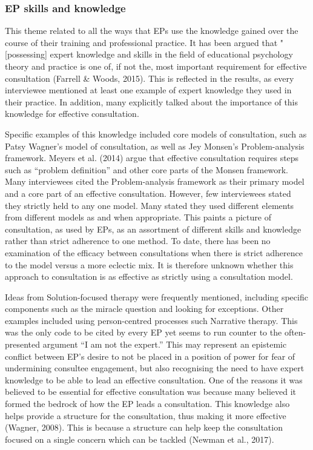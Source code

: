 \documentclass[
  english,
  man,floatsintext]{apa6}
\begin{document}
\hypertarget{ep-skills-and-knowledge}{%
\subsubsection{EP skills and knowledge}\label{ep-skills-and-knowledge}}

This theme related to all the ways that EPs use the knowledge gained
over the course of their training and professional practice. It has been
argued that "{[}possessing{]} expert knowledge and skills in the field of
educational psychology theory and practice is one of, if not the, most
important requirement for effective consultation
(Farrell \& Woods, 2015). This is reflected in the
results, as every interviewee mentioned at least one example of expert
knowledge they used in their practice. In addition, many explicitly
talked about the importance of this knowledge for effective
consultation.

Specific examples of this knowledge included core models of
consultation, such as Patsy Wagner's model of consultation, as well as
Jey Monsen's Problem-analysis framework.
Meyers et al. (2014) argue that effective consultation
requires steps such as ``problem definition'' and other core parts of the
Monsen framework. Many interviewees cited the Problem-analysis framework
as their primary model and a core part of an effective consultation.
However, few interviewees stated they strictly held to any one model.
Many stated they used different elements from different models as and
when appropriate. This paints a picture of consultation, as used by EPs,
as an assortment of different skills and knowledge rather than strict
adherence to one method. To date, there has been no examination of the
efficacy between consultations when there is strict adherence to the
model versus a more eclectic mix. It is therefore unknown whether this
approach to consultation is as effective as strictly using a
consultation model.

Ideas from Solution-focused therapy were frequently mentioned, including
specific components such as the miracle question and looking for
exceptions. Other examples included using person-centred processes such
Narrative therapy. This was the only code to be cited by every EP yet
seems to run counter to the often-presented argument ``I am not the
expert.'' This may represent an epistemic conflict between EP's desire to
not be placed in a position of power for fear of undermining consultee
engagement, but also recognising the need to have expert knowledge to be
able to lead an effective consultation. One of the reasons it was
believed to be essential for effective consultation was because many
believed it formed the bedrock of how the EP leads a consultation. This
knowledge also helps provide a structure for the consultation, thus
making it more effective (Wagner, 2008).
This is because a structure can help keep the consultation focused on a
single concern which can be tackled
(Newman et al., 2017).
\end{document}
